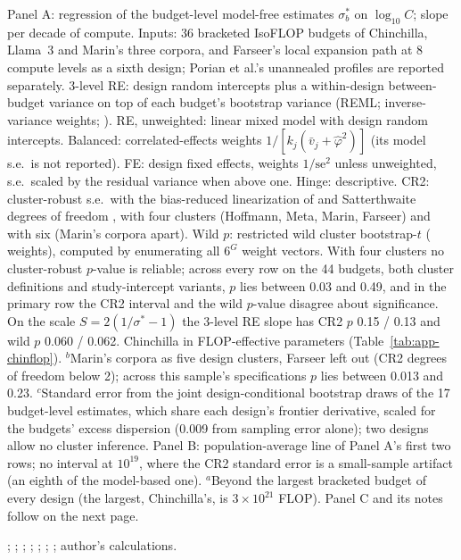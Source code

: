 \begin{table}[tp]
\begin{tablenotes}
Panel A: regression of the budget-level model-free estimates $\sigma^*_b$ on $\log_{10}C$; slope per decade of compute. Inputs: 36 bracketed IsoFLOP budgets of Chinchilla, Llama~3 and Marin's three corpora, and Farseer's local expansion path at 8 compute levels as a sixth design; Porian et al.'s unannealed profiles are reported separately. 3-level RE: design random intercepts plus a within-design between-budget variance on top of each budget's bootstrap variance (REML; inverse-variance weights; \citealt{konstantopoulos2011fixed}). RE, unweighted: linear mixed model with design random intercepts. Balanced: correlated-effects weights $1/[k_j(\bar v_j+\hat\varphi^2)]$ \citep{hedges2010robust} (its model s.e.\ is not reported). FE: design fixed effects, weights $1/\mathrm{se}^2$ unless unweighted, s.e.\ scaled by the residual variance when above one. Hinge: descriptive. CR2: cluster-robust s.e.\ with the bias-reduced linearization of \citet{bell2002bias} and Satterthwaite degrees of freedom \citep{pustejovsky2018small,tipton2015small}, with four clusters (Hoffmann, Meta, Marin, Farseer) and with six (Marin's corpora apart). Wild $p$: restricted wild cluster bootstrap-$t$ (\citealt{webb2023reworking} weights), computed by enumerating all $6^G$ weight vectors. With four clusters no cluster-robust $p$-value is reliable; across every row on the 44 budgets, both cluster definitions and study-intercept variants, $p$ lies between 0.03 and 0.49, and in the primary row the CR2 interval and the wild $p$-value disagree about significance. On the scale $S=2(1/\sigma^*-1)$ the 3-level RE slope has CR2 $p$ 0.15 / 0.13 and wild $p$ 0.060 / 0.062. Chinchilla in FLOP-effective parameters (Table~\ref{tab:app-chinflop}). $^{b}$Marin's corpora as five design clusters, Farseer left out (CR2 degrees of freedom below 2); across this sample's specifications $p$ lies between 0.013 and 0.23. $^{c}$Standard error from the joint design-conditional bootstrap draws of the 17 budget-level estimates, which share each design's frontier derivative, scaled for the budgets' excess dispersion (0.009 from sampling error alone); two designs allow no cluster inference. Panel B: population-average line of Panel A's first two rows; no interval at $10^{19}$, where the CR2 standard error is a small-sample artifact (an eighth of the model-based one). $^{a}$Beyond the largest bracketed budget of every design (the largest, Chinchilla's, is $3\times10^{21}$ FLOP). Panel C and its notes follow on the next page.
\end{tablenotes}

\begin{tablenotes}[Source]
\citet{hoffmann2022training}; \citet{besiroglu2024chinchilla}; \citet{grattafiori2024llama}; \citet{czech2026llama3isoflop}; \citet{marin2026ladders}; \citet{porian2024resolving}; \citet{li2025predictableb}; author's calculations.
\end{tablenotes}
\end{table}

